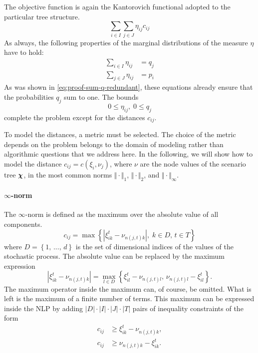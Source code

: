 The objective function is again the Kantorovich functional adopted to the particular tree structure.
\begin{equation}
  \label{eq:NLP-derivation-objective}
  \sum_{i\in I}\sum_{j\in J} \eta_{ij} c_{ij}
\end{equation}
As always, the following properties of the marginal distributions of the measure $\eta$ have to hold:
\begin{subequations}
\begin{align}
  \label{eq:eta-nlp-marginal-q}
  \sum_{i\in I}\eta_{ij} &= q_j\\
  \label{eq:eta-nlp-marginal-p}
  \sum_{j\in J}\eta_{ij} &= p_i
\end{align}
\end{subequations}
As was shown in \eqref{eq:proof-sum-q-redundant}, these equations already ensure that the probabilities $q_j$ sum to one.
The bounds
\begin{equation}
  \label{eq:bounds-nlp-q-eta}
  0 \leq \eta_{ij},\; 0\leq q_j
\end{equation}
complete the problem except for the distances $c_{ij}$.

To model the distances, a metric must be selected. The choice of the metric depends on the problem belongs to the domain of modeling rather than algorithmic questions that we address here. In the following, we will show how to model the distance $c_{ij}=c(\xi_i,\nu_j)$, where $\nu$ are the node values of the scenario tree $\boldsymbol\chi$, in the most common norms $\Vert\cdot\Vert_1$, $\Vert\cdot\Vert_2$, and $\Vert\cdot\Vert_\infty$.
%
\paragraph{$\infty$-norm} The $\infty$-norm is defined as the maximum over the absolute value of all components.
\begin{equation}
  \label{eq:max-c-definition}
  c_{ij} = \max\left\{\left|\xi_{ik}^t-\nu_{n(j,t)k}\right|,\; k\in D,\, t\in T\right\}\nonumber
\end{equation}
where $D=\left\{1,\, ...,\,d\right\}$ is the set of dimensional indices of the values of the stochastic process. The absolute value can be replaced by the maximum expression
\begin{equation}
  \label{eq:abs-is-a-max}
  \left|\xi_{ik}^t-\nu_{n(j,t)k}\right| = \max\limits_{l\in D}\left\{\xi_{il}^t-\nu_{n(j,t)l},\, \nu_{n(j,t)l}-\xi_{il}^t\right\}.\nonumber
\end{equation}
The maximum operator inside the maximum can, of course, be omitted. What is left is the maximum of a finite number of terms. This maximum can be expressed inside the NLP by adding $ |D| \cdot |I|\cdot |J|\cdot |T|$ pairs of inequality constraints of the form
\begin{subequations}
\begin{align}
  \label{eq:c-as-inftynorm}
  c_{ij} &\geq \xi_{ik}^t - \nu_{n(j,t)k},\\
  c_{ij} &\geq \nu_{n(j,t)k} - \xi_{ik}^t.
\end{align}
\end{subequations}
